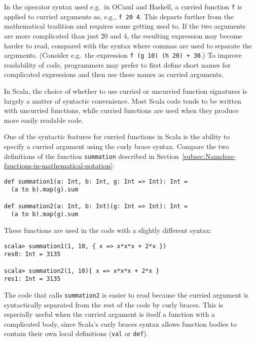 In the operator syntax used e.g.\ in OCaml and Haskell, a curried
function \lstinline!f!
is applied to curried arguments as, e.g., \lstinline!f 20 4!.
This departs further from the mathematical tradition and requires
some getting used to. If the two arguments are more complicated than
just $20$ and $4$, the resulting expression may become harder to
read, compared with the syntax where commas are used to separate the
arguments. (Consider e.g.~the expression \lstinline!f (g 10) (h 20) + 30!.)
To improve readability of code, programmers may prefer to first define
short names for complicated expressions and then use these names as
curried arguments.

In Scala, the choice of whether to use curried or uncurried function
signatures is largely a matter of syntactic convenience. Most Scala
code tends to be written with uncurried functions, while curried functions
are used when they produce more easily readable code.

One of the syntactic features for curried functions in Scala is the
ability to specify a curried argument using the curly brace syntax.
Compare the two definitions of the function \lstinline!summation!
described in Section~\ref{subsec:Nameless-functions-in-mathematical-notation}:
\begin{lstlisting}
def summation1(a: Int, b: Int, g: Int => Int): Int =
  (a to b).map(g).sum

def summation2(a: Int, b: Int)(g: Int => Int): Int =
  (a to b).map(g).sum
\end{lstlisting}
These functions are used in the code with a slightly different syntax:
\begin{lstlisting}
scala> summation1(1, 10, { x => x*x*x + 2*x })
res0: Int = 3135

scala> summation2(1, 10){ x => x*x*x + 2*x }
res1: Int = 3135
\end{lstlisting}
The code that calls \lstinline!summation2!
is easier to read because the curried argument is syntactically separated
from the rest of the code by curly braces. This is especially useful
when the curried argument is itself a function with a complicated
body, since Scala's curly braces syntax allows function bodies to
contain their own local definitions (\lstinline!val!
or \lstinline!def!).

